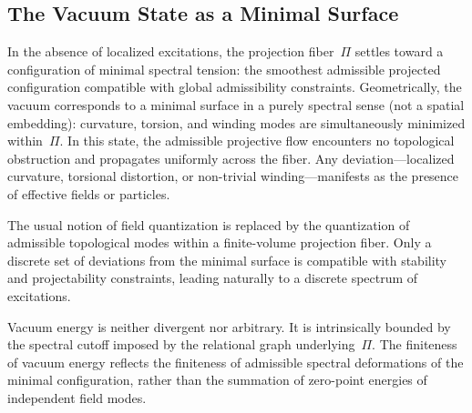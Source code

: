 \subsection{The Vacuum State as a Minimal Surface}
  \label{subsec:vacuum-minimal-surface}

  In the absence of localized excitations, the projection fiber~$\Pi$
  settles toward a configuration of minimal spectral tension: the smoothest
  admissible projected configuration compatible with global admissibility
  constraints.
  Geometrically, the vacuum corresponds to a minimal surface in a purely
  spectral sense (not a spatial embedding): curvature, torsion, and winding
  modes are simultaneously minimized within~$\Pi$.
  In this state, the admissible projective flow encounters no topological
  obstruction and propagates uniformly across the fiber.
  Any deviation---localized curvature, torsional distortion, or non-trivial
  winding---manifests as the presence of effective fields or particles.

  The usual notion of field quantization is replaced by the quantization of
  admissible topological modes within a finite-volume projection fiber.
  Only a discrete set of deviations from the minimal surface is compatible
  with stability and projectability constraints, leading naturally to a
  discrete spectrum of excitations.

  Vacuum energy is neither divergent nor arbitrary.
  It is intrinsically bounded by the spectral cutoff imposed by the
  relational graph underlying~$\Pi$.
  The finiteness of vacuum energy reflects the finiteness of admissible
  spectral deformations of the minimal configuration, rather than the
  summation of zero-point energies of independent field modes.
